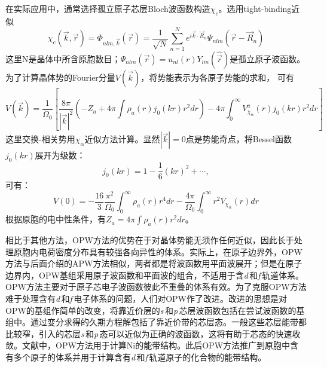 在实际应用中，通常选择孤立原子芯层Bloch波函数构造$\chi_c$。选用tight-binding近似
$$\chi_c(\vec k,\vec r)=\Phi_{nlm,\vec k}(\vec r)=\frac1{\sqrt N}\sum_{n=1}^Ne^{i\vec k\cdot\vec R_n}\Psi_{nlm}(\vec r-\vec R_n)$$
这里N是晶体中所含原胞数目；$\Psi_{nlm}(\vec r)=u_{nl}(r)Y_{lm}(\hat{\vec r})$是孤立原子波函数。为了计算晶体势的Fourier分量$V(\vec k)$，将势能表示为各原子势能的求和，%
可有\cite{Euwema-Stukel-Collins}
\begin{equation}
  V(\vec k)=\frac1{\Omega_0}\left[\frac{8\pi}{|\vec k|^2}\left(-Z_a+4\pi\int\rho_a(r)j_0(kr)r^2dr\right)-4\pi\int_0^{\infty}V_{\chi_{\alpha}}^a(r)j_0(kr)r^2dr\right]
  \label{eq:solid-87}
\end{equation}
这里交换-相关势用$\chi_\alpha$近似方法计算。显然$|\vec k|=0$点是势能奇点，将Bessel函数$j_0(kr)$展开为级数：
$$j_0(kr)=1-\frac16(kr)^2+\cdots,$$可有：
\begin{equation}
  V(0)=-\frac{16}3\frac{\pi^2}{\Omega_0}\int_0^{\infty}\rho_a(r)r^4dr-\frac{4\pi}{\Omega_0}\int_0^{\infty}r^2V_{\chi_{\alpha}}(r)dr
  \label{eq:solid-88}
\end{equation}
根据原胞的电中性条件，有$Z_a=4\pi\int\rho_a(r)r^2dr$。

相比于其他方法，OPW方法的优势在于对晶体势能无须作任何近似，因此长于处理原胞内电荷密度分布具有较强各向异性的体系。实际上，在原子边界外，OPW方法与后面介绍的APW方法相似，两者都是将波函数用平面波展开；但是在原子边界内，OPW基组采用原子波函数和平面波的组合，不适用于含{\it d}\,和{\it f}\,轨道体系。OPW方法主要对于原子芯电子波函数彼此不重叠的体系有效。为了克服OPW方法难于处理含有{\it d}\,和{\it f}\,电子体系的问题，人们对OPW作了改进\cite{PR57-1169_1940,PR99-500_1955}。改进的思想是对OPW的基组作简单的改变，将靠近价层的{\it s}\,和{\it p}\,芯层波函数包括在尝试波函数的基组中。通过变分求得的久期方程解包括了靠近价带的芯层态。一般这些芯层能带都比较窄，引入的芯层{\it s}\,和{\it p}\,态可以近似为正确的波函数，这将有助于芯态的快速收敛。文献\cite{PR164-993_1967}中，OPW方法用于计算Ni的能带结构。此后OPW方法推广到原胞中含有多个原子的体系并用于计算含有{\it d}\,和{\it f}\,轨道原子的化合物的能带结构\cite{PSSB94-51_1979,PSSB97-631_1980}。

